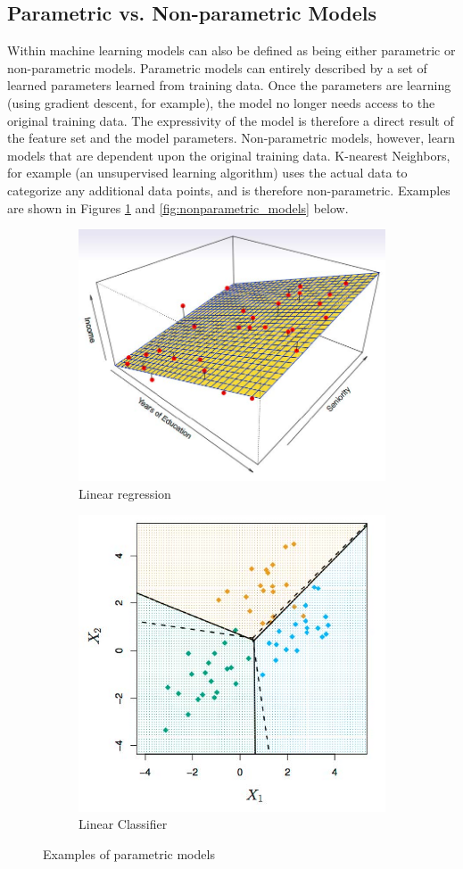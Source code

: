 \documentclass[twoside]{article}
\begin{document}
\subsection{Parametric vs. Non-parametric Models}
Within machine learning models can also be defined as being either parametric or non-parametric models. Parametric models can entirely described by a set of learned parameters learned from training data. Once the parameters are learning (using gradient descent, for example), the model no longer needs access to the original training data. The expressivity of the model is therefore a direct result of the feature set and the model parameters. Non-parametric models, however, learn models that are dependent upon the original training data. K-nearest Neighbors, for example (an unsupervised learning algorithm) uses the actual data to categorize any additional data points, and is therefore non-parametric. Examples are shown in Figures \ref{fig:parametric_models} and \ref{fig:nonparametric_models} below. \\

\begin{figure}[H]
    \centering
    \begin{subfigure}{.5\textwidth}
      \centering
      \includegraphics[width=.4\linewidth]{pics/lecture_8_linear_regression.jpg}
      \caption*{Linear regression}
    \end{subfigure}%
    \begin{subfigure}{.5\textwidth}
      \centering
      \includegraphics[width=.4\linewidth]{pics/lecture_8_linear_classifier.jpg}
      \caption*{Linear Classifier}
    \end{subfigure}
	\caption{Examples of parametric models}
    \label{fig:parametric_models}
\end{figure}
\end{document}
